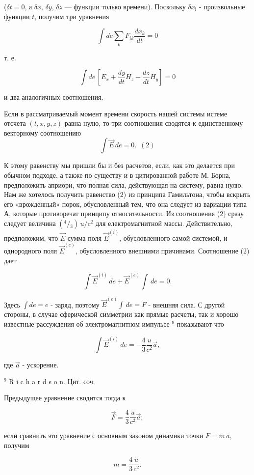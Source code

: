 \documentclass[11pt]{article}
\begin{document}
(\(\delta t = 0\), а \(\delta x\), \(\delta y\), \(\delta z\) ---
функции только времени). Поскольку \(\delta {{x}_{і}}\) - произвольные функции
\(t\), получим три уравнения

\[\int de \sum_{k} F_{ik}  \frac{dx_{k}}{dt} = 0\]

т. е.

\[\int de \, \left[ E_{x}  + \frac{dy}{dt} H_{z} - \frac{dz}{dt} H_{y} \right]= 0\]

и два аналогичных соотношения.

    Если в рассматриваемый момент времени скорость нашей системы истеме
отсчета \((t, x, y, z)\) равна нулю, то три соотношения сводятся к
единственному векторному соотношению
\[\int \vec {E} \, de = 0. \,\,\, (2)\]

    К этому равенству мы пришли бы и без расчетов, если, как это делается
при обычном подходе, а также по существу и в цитированной работе М.
Борна, предположить априори, что полная сила, действующая на систему,
равна нулю. Нам же хотелось получить равенство (2) из принципа
Гамильтона, чтобы вскрыть его «врожденный» порок, обусловленный тем, что
она следует из вариации типа А, которые противоречат принципу
относительности. Из соотношения (2) сразу следует величина
\(\left({}^{4} \big /{}_{3}\right) \, u/c^2\) для електромагнитной
массы. Действительно, предположим, что \(\vec {E}\) сумма поля
\({\vec {E}}^{(i)}\), обусловленного самой системой, и однородного поля
\({\vec {E}}^{(e)}\), обусловленного внешними причинами. Соотношение (2)
дает

\[\int {\vec {E}}^{(i)} \, de + {\vec {E}}^{(e)} \int\, de = 0.\]

    Здесь \(\int de = e\) - заряд, поэтому \({\vec {E}}^{(e)} \int\, de = F\) -
внешняя сила. С другой стороны, в случае сферической симметрии как
прямые расчеты, так и хорошо известные рассуждения об электромагнитном
импульсе \(^{9}\) показывают что

\[\int {\vec {E}}^{(i)} \, de = - \frac{4}{3} \frac{u}{c^2} \vec{a},\]

где \(\vec{a}\) - ускорение.

    \(^{9}\) R i c h a r d s o n. Цит. соч.

    Предыдущее уравнение сводится тогда к

\[\vec{F} = \frac{4}{3} \frac{u}{c^2} \vec{a};\]

если сравнить это уравнение с основным законом динамики точки
\(F = m \, a\), получим

\[m = \frac{4}{3} \frac{u}{c^2}.\]
\end{document}
